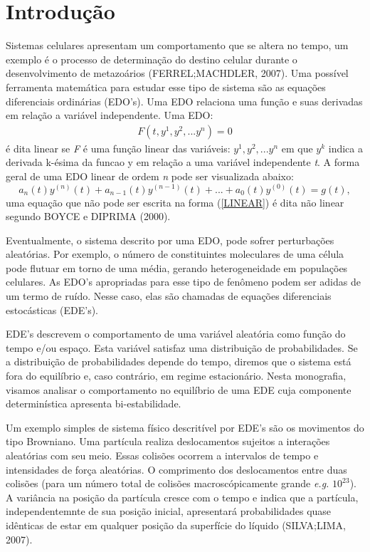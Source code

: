 \chapter*{Introdução}

Sistemas celulares apresentam um comportamento que se altera no tempo, um exemplo é o 
processo de determinação do destino celular durante o desenvolvimento de metazoários (FERREL;MACHDLER, 2007).
Uma possível ferramenta matemática para estudar esse tipo de sistema são as 
equações diferenciais ordinárias (EDO's).
Uma EDO relaciona uma função e suas derivadas em relação a variável independente. Uma EDO:
\begin{eqnarray} \label{EDOFormaGeral}
F(t, y^{1}, y^{2},... y^{n}) = 0
\end{eqnarray}
é dita linear se \textit{F} é uma função linear das variáveis: $y^{1}, y^{2},... y^{n}$ em que $y^{k}$ indica a derivada k-ésima da funcao y em relação a uma variável independente \textit{t}. A forma geral de uma EDO linear de ordem \textit{n} pode ser visualizada abaixo:
\begin{equation} \label{LINEAR}
a_{n}(t)y^{(n)}(t) + a_{n-1}(t)y^{(n-1)}(t) +...+ a_{0}(t)y^{(0)}(t) = g(t),
\end{equation}
uma equação que não pode ser escrita na forma (\ref{LINEAR}) é dita não linear segundo BOYCE e DIPRIMA (2000).

Eventualmente, o sistema descrito por uma EDO, pode sofrer 
perturbações aleatórias. 
Por exemplo, o número de constituintes moleculares de uma célula pode flutuar em torno de uma média, 
gerando heterogeneidade em populações celulares. As EDO's apropriadas para esse tipo de fenômeno 
podem ser adidas de um termo de ruído. Nesse caso, elas são chamadas de equações diferenciais estocásticas (EDE's).

EDE's descrevem o comportamento de uma variável aleatória como função do tempo e/ou espaço.
Esta variável satisfaz uma distribuição de probabilidades. Se a distribuição de probabilidades depende do tempo, diremos que o sistema está fora do equilíbrio e, caso contrário, em regime estacionário. Nesta monografia, visamos analisar o comportamento
no equilíbrio de uma EDE cuja componente determinística apresenta bi-estabilidade. 

Um exemplo simples de sistema físico descritível por EDE's são os movimentos do tipo Browniano. Uma partícula realiza deslocamentos sujeitos a interações aleatórias com seu meio. Essas colisões ocorrem a intervalos de tempo e intensidades de força aleatórias. O comprimento dos deslocamentos entre duas colisões (para um número total de colisões macroscópicamente grande \textit{e.g.} $10^{23}$). A variância na posição da partícula cresce com o tempo e indica que a partícula, independentemnte de sua posição inicial, apresentará probabilidades quase idênticas de estar em qualquer posição da superfície do líquido (SILVA;LIMA, 2007).

